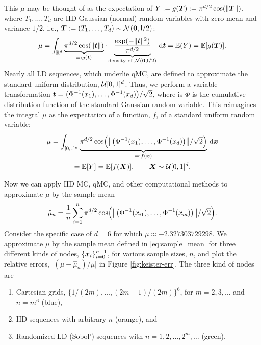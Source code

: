 \documentclass{svproc}
\begin{document}
This $\mu$ may be thought of as the expectation of $Y := g({\boldsymbol{T}}) := \pi^{d/2} \cos(\lVert {\boldsymbol{T}} \rVert)$, where $T_1, \ldots, T_d$ are IID Gaussian (normal) random variables with zero mean and variance $1/2$, i.e., ${\boldsymbol{T}} :=(T_1, \ldots, T_d) \sim {\mathcal{N}}({\boldsymbol{0}},\mathsf{I}/2)$:
\begin{equation}\label{eq:keisterB}
	\mu = \int_{\mathbb{R}^d} \underbrace{\pi^{d/2} \cos(\lVert {\boldsymbol{t}} \rVert)}_{=:g({\boldsymbol{t}})} \cdot \underbrace{\frac{\exp(-\lVert {\boldsymbol{t}} \rVert^2)}{\pi^{d/2}}}_{\text{density of } {\mathcal{N}}({\boldsymbol{0}},\mathsf{I}/2)} \, {\mathrm{d}} {\boldsymbol{t}} = {\mathbb{E}}(Y) = {\mathbb{E}}[g({\boldsymbol{T}})].
\end{equation}
Nearly all LD sequences, which underlie qMC, are defined to approximate the standard uniform distribution, ${\mathcal{U}}[0,1]^d$.  Thus, we perform a variable transformation ${\boldsymbol{t}} = \bigl (\Phi^{-1}(x_1), \ldots, \Phi^{-1}(x_d) \bigr )/\sqrt{2}$,
where is $\Phi$ is the cumulative distribution function of the standard Gaussian random variable.  This reimagines the integral $\mu$ as the expectation of a function, $f$, of a standard uniform random variable:
\begin{multline}\label{eq:keisterC}
	\mu = \int_{[0,1]^d} \underbrace{\pi^{d/2} \cos\Bigl (\bigl \lVert \bigl( \Phi^{-1}(x_1), \ldots, \Phi^{-1}(x_d)\bigr) \bigr\rVert/\sqrt{2}  \Bigr)}_{=:f({\boldsymbol{x}})} \, {\mathrm{d}} {\boldsymbol{x}} \\
	= {\mathbb{E}}[Y]
	= {\mathbb{E}}[f({\boldsymbol{X}})], \qquad {\boldsymbol{X}} \sim {\mathcal{U}}[0,1]^d.
\end{multline}

Now we can apply IID MC, qMC, and other computational methods to approximate $\mu$ by the sample mean
\begin{equation} \label{eq:sample_mean_Keister}
	\hat{\mu}_n = \frac 1n \sum_{i=1}^n \pi^{d/2} \cos\Bigl (\bigl \lVert \bigl( \Phi^{-1}(x_{i1}), \ldots, \Phi^{-1}(x_{id})\bigr) \bigr\rVert/\sqrt{2}  \Bigr).
\end{equation}
Consider the specific case of $d=6$ for which $\mu \approx -2.327303729298$.  We approximate $\mu$ by the sample mean defined in \eqref{eq:sample_mean} for three different kinds of nodes, $\{{\boldsymbol{x}}_i\}_{i=0}^{n-1}$, for various sample sizes, $n$, and plot the relative errors, $\lvert (\mu - 	\hat{\mu}_n)/\mu\rvert$ in Figure \ref{fig:keister-err}. The three kind of nodes are
\begin{enumerate}
	\renewcommand{\labelenumi}{\roman{enumi}.}
	\item Cartesian grids, $\{1/(2m), \ldots, (2m-1)/(2m) \}^6$, for $m = 2, 3, \ldots$ and $n = m^6$ (blue),
	\item IID sequences with arbitrary $n$ (orange), and
	\item Randomized LD (Sobol') sequences with $n = 1, 2, \ldots, 2^m, \ldots $ (green).
\end{enumerate}
\end{document}
